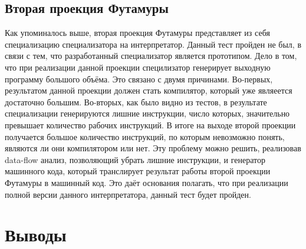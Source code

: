 \documentclass{spbau-diploma}
\begin{document}
\subsection{ Вторая проекция Футамуры}
Как упоминалось выше, вторая проекция Футамуры представляет из себя специализацию специализатора на интерпретатор. Данный тест пройден не был, в связи с тем, что разработанный специализатор является прототипом. Дело в том, что при реализации данной проекции специлизатор генерирует выходную программу большого объёма. Это связано с двумя причинами. Во-первых, результатом данной проекции должен стать компилятор, который уже являеется достаточно большим. Во-вторых, как было видно из тестов, в результате специализации генерируются лишние инструкции, число которых, значительно превышает количество рабочих инструкций. В итоге на выходе второй проекции получается большое количество инструкций, по которым невозможно понять, являются ли они компилятором или нет. Эту проблему можно решить, реализовав data-flow анализ, позволяющий убрать лишние инструкции, и генератор машинного кода, который транслирует результат работы второй проекции Футамуры в машинный код. Это даёт основания полагать, что при реализации полной версии данного интерпретатора, данный тест будет пройден.

\section*{Выводы}
\end{document}
